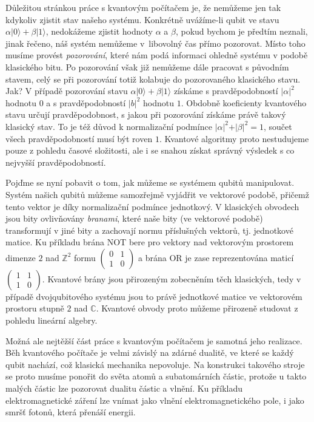 \documentclass[12pt]{report}
\begin{document}
Důležitou stránkou práce s kvantovým počítačem je, že nemůžeme jen tak kdykoliv zjistit stav našeho systému. Konkrétně uvážíme-li qubit ve stavu $ \alpha \vert 0 \rangle + \beta \vert 1 \rangle$, nedokážeme zjistit hodnoty $\alpha$ a $\beta$, pokud bychom je předtím neznali, jinak řečeno, náš systém nemůžeme v~libovolný čas přímo pozorovat. Místo toho musíme provést \textit{pozorování}, které nám podá informaci ohledně systému v podobě klasického bitu. Po pozorování však již nemůžeme dále pracovat s původním stavem, celý se při pozorování totiž kolabuje do pozorovaného klasického stavu. Jak? V případě pozorování stavu $\alpha \vert 0 \rangle + \beta \vert 1 \rangle$ získáme s pravděpodobností $\vert \alpha \vert ^2$ hodnotu $0$ a s pravděpodobností $\vert b \vert ^2$ hodnotu $1$. Obdobně koeficienty kvantového stavu určují pravděpodobnost, s jakou při pozorování získáme právě takový klasický stav. To je též důvod k normalizační podmínce $\vert \alpha \vert ^2 + \vert \beta \vert ^2 = 1$, součet všech pravděpodobností musí být roven $1$. Kvantové algoritmy proto nestudujeme pouze z pohledu časové složitosti, ale i se snahou získat správný výsledek s co nejvyšší pravděpodobností. 

Pojďme se nyní pobavit o tom, jak můžeme se systémem qubitů manipulovat. Systém našich qubitů můžeme samozřejmě vyjádřit ve vektorové podobě, přičemž tento vektor je díky normalizační podmínce jednotkový. V klasických obvodech jsou bity ovlivňovány \textit{branami}, které naše bity (ve vektorové podobě) transformují v jiné bity a zachovají normu příslušných vektorů, tj. jednotkové matice. Ku příkladu brána NOT bere pro vektory nad vektorovým prostorem dimenze $2$ nad $\mathbb{Z}^2$ formu $\begin{pmatrix}
0 & 1\\
1 & 0
\end{pmatrix}$ a brána OR je zase reprezentována maticí $\begin{pmatrix}
1 & 1\\
1 & 0
\end{pmatrix}$. Kvantové brány jsou přirozeným zobecněním těch klasických, tedy v případě dvojqubitového systému jsou to právě jednotkové matice ve vektorovém prostoru stupně $2$ nad $\mathbb{C}$. Kvantové obvody proto můžeme přirozeně studovat z pohledu lineární algebry.

Možná ale nejtěžší část práce s kvantovým počítačem je samotná jeho realizace. Běh kvantového počítače je velmi závislý na zdárné dualitě, ve které se každý qubit nachází, což klasická mechanika nepovoluje. Na konstrukci takového stroje se proto musíme ponořit do světa atomů a subatomárních částic, protože u takto malých částic lze pozorovat dualitu částic a vlnění. Ku příkladu elektromagnetické záření lze vnímat jako vlnění elektromagnetického pole, i jako smršť fotonů, která přenáší energii. 
\end{document}
